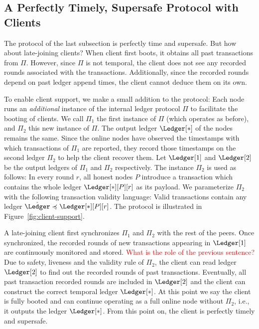 \subsection{A Perfectly Timely, Supersafe Protocol with Clients}

The protocol of the last subsection is perfectly time and supersafe.
But how about late-joining clients?
When client first boots, it obtains all past transactions
from $\Pi$.
However, since $\Pi$ is not temporal, the client does not see any recorded rounds
associated with the transactions. Additionally, since the recorded rounds depend
on past ledger append times, the client cannot deduce them on its own.

To enable client support, we make a small addition to the protocol:
Each node runs an \emph{additional} instance of the internal
ledger protocol $\Pi$
to facilitate the booting of clients.
We call $\Pi_1$ the first instance of $\Pi$
(which operates as before),
and $\Pi_2$ this new instance of $\Pi$.
The output ledger $\Ledger[*]$ of the nodes remains the same.
Since the online nodes have observed the timestamps with which
transactions of $\Pi_1$ are reported, they record those
timestamps on the second ledger $\Pi_2$ to help the client
recover them.
Let $\Ledger[1]$ and $\Ledger[2]$ be the output ledgers
of $\Pi_1$ and $\Pi_2$ respectively.
The instance $\Pi_2$ is used as follows:
In every round $r$, all honest nodes $P$ introduce a transaction
which contains the whole ledger $\Ledger[*][P][r]$ as its payload.
We parameterize $\Pi_2$ with the following transaction validity language:
Valid transactions contain any ledger $\hat \Ledger \preccurlyeq \Ledger[*][P][r]$.
The protocol is illustrated in Figure~\ref{fig:client-support}.

A late-joining client first synchronizes $\Pi_1$ and $\Pi_2$ with the rest
of the peers. Once synchronized, the recorded rounds of new
transactions appearing in $\Ledger[1]$ are continuously monitored and stored.
\textcolor{red}{What is the role of the previous sentence?}
Due to safety, liveness and the validity rule of $\Pi_2$,
the client can read ledger $\Ledger[2]$ to find out the
recorded rounds of past transactions.
Eventually, all past transaction recorded rounds are included in $\Ledger[2]$
and the client can construct the correct temporal ledger $\Ledger[*]$.
At this point we say the client is fully booted and can continue
operating as a full online node without $\Pi_2$, i.e., it outputs the ledger $\Ledger[*]$.
From this point on, the client is perfectly timely and supersafe.

